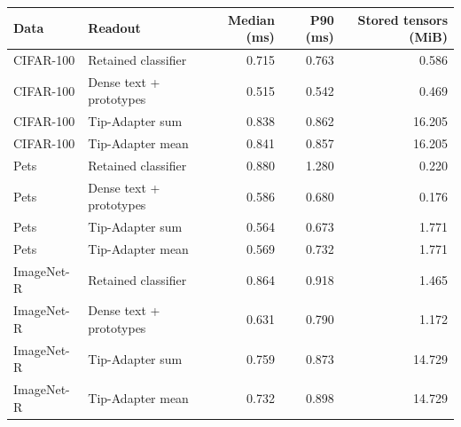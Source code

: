 \begin{tabular}{llrrr}
\toprule
Data & Readout & Median (ms) & P90 (ms) & Stored tensors (MiB) \\
\midrule
CIFAR-100 & Retained classifier & 0.715 & 0.763 & 0.586 \\
CIFAR-100 & Dense text + prototypes & 0.515 & 0.542 & 0.469 \\
CIFAR-100 & Tip-Adapter sum & 0.838 & 0.862 & 16.205 \\
CIFAR-100 & Tip-Adapter mean & 0.841 & 0.857 & 16.205 \\
\midrule
Pets & Retained classifier & 0.880 & 1.280 & 0.220 \\
Pets & Dense text + prototypes & 0.586 & 0.680 & 0.176 \\
Pets & Tip-Adapter sum & 0.564 & 0.673 & 1.771 \\
Pets & Tip-Adapter mean & 0.569 & 0.732 & 1.771 \\
\midrule
ImageNet-R & Retained classifier & 0.864 & 0.918 & 1.465 \\
ImageNet-R & Dense text + prototypes & 0.631 & 0.790 & 1.172 \\
ImageNet-R & Tip-Adapter sum & 0.759 & 0.873 & 14.729 \\
ImageNet-R & Tip-Adapter mean & 0.732 & 0.898 & 14.729 \\
\bottomrule
\end{tabular}
